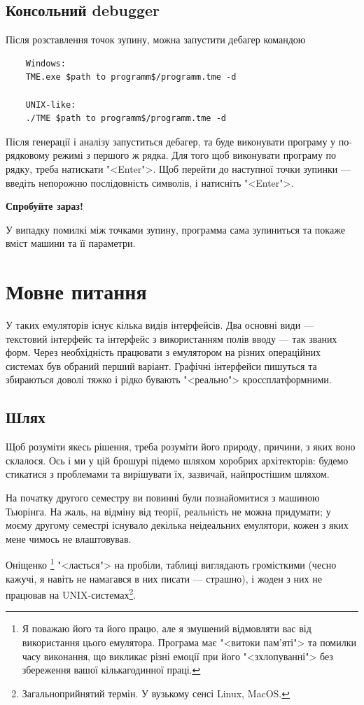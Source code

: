 \documentclass[oneside,final,14pt]{extreport}
\begin{document}
\section{Консольний debugger}
Після розставлення точок зупину, можна запустити дебагер командою
\begin{tcolorbox}	
\begin{verbatim}
	Windows:
	TME.exe $path to programm$/programm.tme -d

	UNIX-like:
	./TME $path to programm$/programm.tme -d
\end{verbatim}
\end{tcolorbox}

Після генерації і аналізу запуститься дебагер, та буде виконувати програму у по-рядковому режимі з першого ж рядка.
Для того щоб виконувати програму по рядку, треба натискати "<Enter">. Щоб перейти до наступної точки зупинки --- введіть непорожню послідовність символів, і натисніть "<Enter">.

{\bfseries Спробуйте зараз!}

У випадку помилкі між точками зупину, программа сама зупиниться та покаже вміст машини та її параметри.

\chapter{Мовне питання}
У таких емуляторів існує кілька видів інтерфейсів. Два основні види --- текстовий інтерфейс та інтерфейс з використанням полів вводу --- так званих форм. Через необхідність працювати з емулятором на різних операційних системах був обраний перший варіант. Графічні інтерфейси пишуться та збираються доволі тяжко і рідко бувають "<реально"> кроссплатформними.
\section{Шлях}
Щоб розуміти якесь рішення, треба розуміти його природу, причини, з яких воно склалося. Ось і ми у цій брошурі підемо шляхом хоробрих архітекторів: будемо стикатися з проблемами та вирішувати їх, зазвичай, найпростішим шляхом.

На початку другого семестру ви повинні були познайомитися з машиною Тьюрінга. На жаль, на відміну від теорії, реальність не можна придумати; у моєму другому семестрі існувало декілька неідеальних емулятори, кожен з яких мене чимось не влаштовував. 

Оніщенко
\footnote{Я поважаю його та його працю, але я змушений відмовляти вас від використання цього емулятора. Програма має "<витоки пам'яті"> та помилки часу виконання, що викликає різні емоції при його "<зхлопуванні"> без збереження вашої кількагодинної праці.}
 "<лається"> на пробіли, таблиці виглядають громісткими (чесно кажучі, я навіть не намагався в них писати --- страшно), і жоден з них не працював на UNIX-системах\footnote{Загальноприйнятий термін. У вузькому сенсі Linux, MacOS.}.
\end{document}

